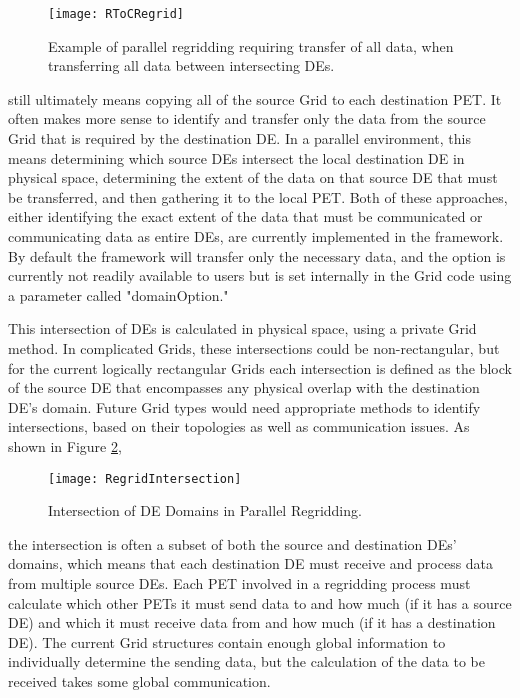 \begin{center}
\begin{figure}
\caption{Example of parallel regridding requiring transfer of all data,
         when transferring all data between intersecting DEs. }
\label{fig:RToCRegrid}
\resizebox{\textwidth}{!}
  {\texttt{[image: RToCRegrid]}}
\end{figure}
\end{center}

still ultimately means copying all of the source Grid to each destination PET.
It often makes more sense to identify and transfer only the data from the
source Grid that is required by the destination DE.  In a parallel environment,
this means determining which source DEs intersect the local destination DE in
physical space, determining the extent of the data on that source DE that must
be transferred, and then gathering it to the local PET.  Both of these
approaches, either identifying the exact extent of the data that must be
communicated or communicating data as entire DEs, are currently implemented in
the framework.  By default the framework will transfer only the necessary data,
and the option is currently not readily available to users but is set internally
in the Grid code using a parameter called "domainOption."

This intersection of DEs is calculated in physical space, using a private Grid
method.  In complicated Grids, these intersections could be non-rectangular, but
for the current logically rectangular Grids each intersection is defined as the
block of the source DE that encompasses any physical overlap with the destination
DE's domain.  Future Grid types would need appropriate methods to identify
intersections, based on their topologies as well as communication issues.  As
shown in Figure \ref{fig:RegridIntersection}, 

\begin{center}
\begin{figure}
\caption{Intersection of DE Domains in Parallel Regridding. }
\label{fig:RegridIntersection}
\resizebox{\textwidth}{!}
  {\texttt{[image: RegridIntersection]}}
\end{figure}
\end{center}

the intersection is often a subset of both the source and destination DEs'
domains, which means that each destination DE must receive and process data from
multiple source DEs.  Each PET involved in a regridding process must calculate
which other PETs it must send data to and how much (if it has a source DE) and
which it must receive data from and how much (if it has a destination DE).  The
current Grid structures contain enough global information to individually
determine the sending data, but the calculation of the data to be received takes
some global communication.


